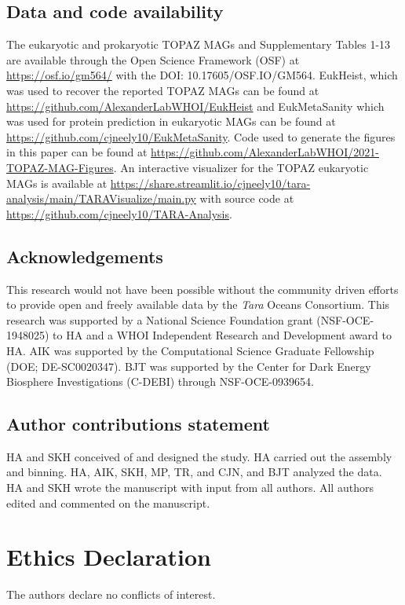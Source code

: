 \documentclass[12pt]{article}
\numberwithin{equation}{section}
\begin{document}
\subsection*{Data and code availability}
The eukaryotic and prokaryotic TOPAZ MAGs and Supplementary Tables 1-13 are available through the Open Science Framework (OSF) at \url{https://osf.io/gm564/} with the DOI: 10.17605/OSF.IO/GM564. EukHeist, which was used to recover the reported TOPAZ MAGs can be found at \url{https://github.com/AlexanderLabWHOI/EukHeist} and EukMetaSanity which was used for protein prediction in eukaryotic MAGs can be found at \url{https://github.com/cjneely10/EukMetaSanity}. Code used to generate the figures in this paper can be found at \url{https://github.com/AlexanderLabWHOI/2021-TOPAZ-MAG-Figures}. An interactive visualizer for the TOPAZ eukaryotic MAGs is available at \url{https://share.streamlit.io/cjneely10/tara-analysis/main/TARAVisualize/main.py} with source code at \url{https://github.com/cjneely10/TARA-Analysis}. 

\subsection*{Acknowledgements}
This research would not have been possible without the community driven efforts to provide open and freely available data by the \textit{Tara} Oceans Consortium. This research was supported by a National Science Foundation grant (NSF-OCE-1948025) to HA and a WHOI Independent Research and Development award to HA. AIK was supported by the Computational Science Graduate Fellowship (DOE; DE-SC0020347). BJT was supported by the Center for Dark Energy Biosphere Investigations (C-DEBI) through NSF-OCE-0939654. 

\subsection*{Author contributions statement}
HA and SKH conceived of and designed the study. HA carried out the assembly and binning. HA, AIK, SKH, MP, TR, and CJN, and BJT analyzed the data. HA and SKH wrote the manuscript with input from all authors. All authors edited and commented on the manuscript.

\section*{Ethics Declaration}
The authors declare no conflicts of interest.



\end{document}
